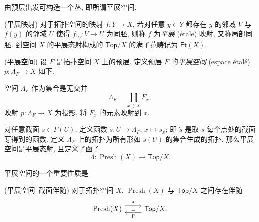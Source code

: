 由预层出发可构造一个丛, 即所谓平展空间.

\begin{definition}
    {(平展映射)}
    对于拓扑空间的映射 $f \colon Y \to X$,
    若对任意 $y\in Y$ 都存在 $y$ 的邻域 $V$ 与 $f(y)$ 的邻域 $U$ 使得 $f|_V \colon V \to U$ 为同胚,
    则称 $f$ 为\emph{平展} (étale) 映射, 又称局部同胚.
    到空间 $X$ 的平展态射构成的 $\mathsf {Top}/X$ 的满子范畴记为 $\mathsf {Et}(X)$.
\end{definition}

\begin{propdef}
	[label={espace-etale}]
    {(平展空间)}
    设 $F$ 是拓扑空间 $X$ 上的预层. 定义预层 $F$ 的\emph{平展空间} (espace étalé)
    $p \colon \Lambda_F \to X$ 如下.

    空间 $\Lambda_F$ 作为集合是无交并
    $$
    \Lambda_F = \coprod_{x\in X} F_x,
    $$
    映射 $p \colon \Lambda_F \to X$ 为投影, 将 $F_x$ 的元素映射到 $x$.
    
    对任意截面 $s\in F(U)$, 定义函数 $\dot{s} \colon U \to \Lambda_F$, $x\mapsto s_x$; 即 $\dot s$ 是取 $s$ 每个点处的截面芽得到的函数.
    定义 $\Lambda_F$ 上的拓扑为所有形如 $\dot{s}(U)$ 的集合生成的拓扑.
    那么平展空间是平展态射, 且定义了函子
    $$
    \Lambda \colon \operatorname{Presh}(X) \to \mathsf {Top}/X.
    $$
\end{propdef}

平展空间的一个重要性质是

\begin{prop}
    [label={etale-section-adjoint}]
    {(平展空间--截面伴随)}
    对于拓扑空间 $X$, $\operatorname{Presh}(X)$ 与 $\mathsf {Top}/X$ 之间存在伴随
    \[\begin{tikzcd}[ampersand replacement=\&]
    	{\operatorname{Presh}(X)} \& {\mathsf {Top}/X.}
    	\arrow[""{name=0, anchor=center, inner sep=0}, "\Gamma", shift left=2, from=1-2, to=1-1]
    	\arrow[""{name=1, anchor=center, inner sep=0}, "\Lambda", shift left=2, from=1-1, to=1-2]
    	\arrow["\dashv"{anchor=center, rotate=-90}, draw=none, from=1, to=0]
    \end{tikzcd}\]
\end{prop}

